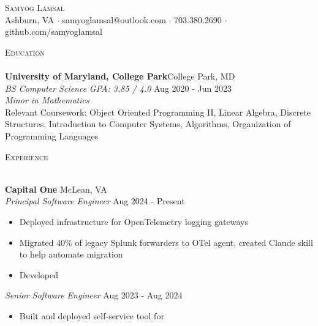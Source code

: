 \documentclass[a4paper]{article}
\newcommand{\lineunder} {
    \vspace*{-8pt} \\
    \hspace*{-18pt} \hrulefill \\
}
\newcommand{\header} [1] {
    {\hspace*{-18pt}\vspace*{6pt} \textsc{#1}}
    \vspace*{-6pt} \lineunder
}
\begin{document}
\vspace*{-40pt}

    

\vspace*{-10pt}
\begin{center}
	{\Huge \scshape {Samyog Lamsal}}\\
	Ashburn, VA $\cdot$ samyoglamsal@outlook.com $\cdot$ 703.380.2690 $\cdot$ github.com/samyoglamsal \\
\end{center}

\header{Education}
\textbf{University of Maryland, College Park}\hfill College Park, MD\\
\textit{BS Computer Science} \textit{GPA: 3.85 / 4.0} \hfill Aug 2020 - Jun 2023 \\
\textit{Minor in Mathematics} \\
\vspace{2mm}
Relevant Coursework: Object Oriented Programming II, Linear Algebra, Discrete Structures, Introduction to Computer Systems, Algorithms, Organization of Programming Languages \\
\vspace{2mm}

\header{Experience}
\vspace{1mm}

\textbf{Capital One} \hfill McLean, VA \\
\textit{Principal Software Engineer} \hfill Aug 2024 - Present \\
\vspace{0mm}
\begin{itemize}
    \item Deployed infrastructure for OpenTelemetry logging gateways
    \item Migrated 40\% of legacy Splunk forwarders to OTel agent, created Claude skill to help automate migration
    \item Developed 
\end{itemize}
\textit{Senior Software Engineer} \hfill Aug 2023 - Aug 2024 \\
\vspace{0mm}
\begin{itemize}
    \item Built and deployed self-service tool for 
\end{itemize}
\end{document}

